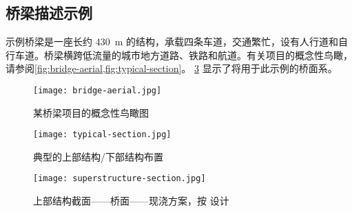 \subsection{桥梁描述示例}

示例桥梁是一座长约 \qty{430}{m} 的结构，承载四条车道，交通繁忙，设有人行道和自行车道。桥梁横跨低流量的城市地方道路、铁路和航道。有关项目的概念性鸟瞰，请参阅\cref{fig:bridge-aerial,fig:typical-section}。 \cref{fig:superstructure-section} 显示了将用于此示例的桥面系。

\begin{figure}
  \texttt{[image: bridge-aerial.jpg]}
  \caption{某桥梁项目的概念性鸟瞰图}
  \label{fig:bridge-aerial}
\end{figure}
\begin{figure}
  \texttt{[image: typical-section.jpg]}
  \caption{典型的上部结构/下部结构布置}
  \label{fig:typical-section}
\end{figure}
\begin{figure}
  \texttt{[image: superstructure-section.jpg]}
  \caption{上部结构截面——桥面——现浇方案，按 \lrfd 设计}
  \label{fig:superstructure-section}
\end{figure}

